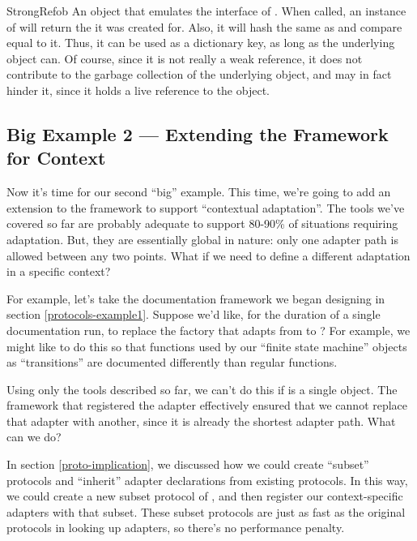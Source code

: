 \begin{verbatim%
}
\begin{verbatim%
}
\begin{verbatim%
}
\begin{verbatim%
}
\begin{verbatim%
}
\begin{verbatim%
}
\begin{classdesc}{StrongRef}{ob}
An object that emulates the interface of .  When called,
an instance of  will return the  it was created for.
Also, it will hash the same as  and compare equal to it.  Thus, it
can be used as a dictionary key, as long as the underlying object can.  Of
course, since it is not really a weak reference, it does not contribute to the
garbage collection of the underlying object, and may in fact hinder it, since
it holds a live reference to the object.
\end{classdesc}



\newpage
\subsection{Big Example 2 --- Extending the Framework for Context\label{protocols-context}}

Now it's time for our second ``big'' example.  This time, we're going to add
an extension to the  framework to support ``contextual
adaptation''.  The tools we've covered so far are probably adequate to support
80-90\% of situations requiring adaptation.  But, they are essentially global
in nature: only one adapter path is allowed between any two points.  What if we
need to define a different adaptation in a specific context?

For example, let's take the documentation framework we began designing in
section \ref{protocols-example1}.  Suppose we'd like, for the duration of a
single documentation run, to replace the factory that adapts from
 to ?  For example, we might like to
do this so that functions used by our ``finite state machine'' objects as
``transitions'' are documented differently than regular functions.

Using only the tools described so far, we can't do this if
 is a single object.  The framework that registered the
 adapter effectively ensured that we cannot
replace that adapter with another, since it is already the shortest adapter
path.  What can we do?

In section \ref{proto-implication}, we discussed how we could create ``subset''
protocols and ``inherit'' adapter declarations from existing protocols.  In
this way, we could create a new subset protocol of , and
then register our context-specific adapters with that subset.  These subset
protocols are just as fast as the original protocols in looking up adapters, so
there's no performance penalty.


\end{verbatim%
}
\end{verbatim%
}
\end{verbatim%
}
\end{verbatim%
}
\end{verbatim%
}
\end{verbatim%
}
